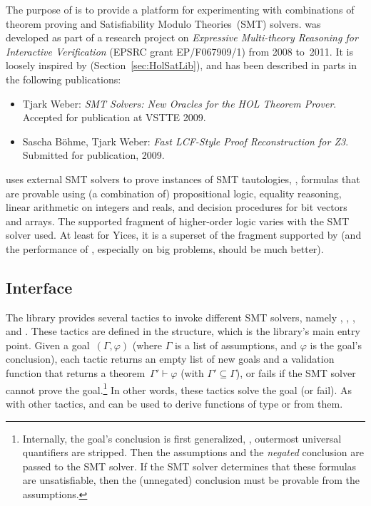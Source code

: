 
\setcounter{sessioncount}{0}

The purpose of  is to provide a platform for
experimenting with combinations of theorem proving and Satisfiability
Modulo Theories~(SMT) solvers.   was developed as part
of a research project on {\it Expressive Multi-theory Reasoning for
  Interactive Verification} (EPSRC grant EP/F067909/1) from 2008
to~2011.  It is loosely inspired by 
(Section~\ref{sec:HolSatLib}), and has been described in parts in the
following publications:
\begin{itemize}
\item Tjark Weber: {\it SMT Solvers: New Oracles for the HOL Theorem
  Prover}.  Accepted for publication at VSTTE 2009.%
\item Sascha B{\"o}hme, Tjark Weber: {\it Fast LCF-Style Proof
  Reconstruction for Z3}. Submitted for publication, 2009.%
\end{itemize}
 uses external SMT solvers to prove instances of SMT
tautologies, \ie, formulas that are provable using (a combination of)
propositional logic, equality reasoning, linear arithmetic on integers
and reals, and decision procedures for bit vectors and arrays.  The
supported fragment of higher-order logic varies with the SMT solver
used.  At least for Yices, it is a superset of the fragment supported
by  (and the performance of ,
especially on big problems, should be much better).

\subsection{Interface}

The library provides several tactics to invoke different SMT solvers,
namely , , , and
.  These tactics are defined in the 
structure, which is the library's main entry point.  Given a
goal~$(\Gamma, \varphi)$ (where $\Gamma$ is a list of assumptions, and
$\varphi$ is the goal's conclusion), each tactic returns an empty list
of new goals and a validation function that returns a theorem~$\Gamma'
\vdash \varphi$ (with $\Gamma' \subseteq \Gamma$), or fails if the SMT
solver cannot prove the goal.\footnote{Internally, the goal's
  conclusion is first generalized, \ie, outermost universal
  quantifiers are stripped.  Then the assumptions and the
  \emph{negated} conclusion are passed to the SMT solver.  If the SMT
  solver determines that these formulas are unsatisfiable, then the
  (unnegated) conclusion must be provable from the assumptions.}  In
other words, these tactics solve the goal (or fail).  As with other
tactics,  and  can be used
to derive functions of type  or  from
them.

